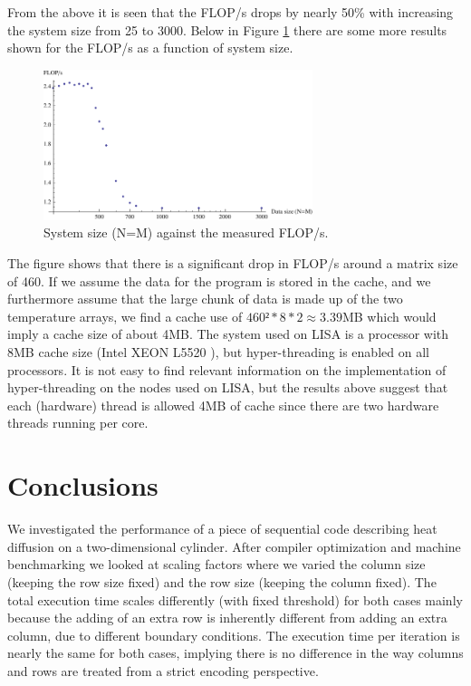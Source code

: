 \documentclass[11pt,a4paper,onecolumn]{article}
\begin{document}
From the above it is seen that the FLOP/s drops by nearly 50\% with increasing the system size from 25 to 3000. Below in Figure \ref{fig:cache} there are some more results shown for the FLOP/s as a function of system size.

\begin{figure}[H]
  \centering
  \includegraphics[width=0.7\textwidth]{cache.pdf}
  \caption{System size (N=M) against the measured FLOP/s.}
  \label{fig:cache}
\end{figure}

The figure shows that there is a significant drop in FLOP/s around a matrix size of 460. If we assume the data for the program is stored in the cache, and we furthermore assume that the large chunk of data is made up of the two temperature arrays, we find a cache use of $460² * 8 * 2 \approx 3.39$MB which would imply a cache size of about 4MB. The system used on LISA is a processor with 8MB cache size (Intel XEON L5520 \cite{LISA}), but hyper-threading is enabled on all processors. It is not easy to find relevant information on the implementation of hyper-threading on the nodes used on LISA, but the results above suggest that each (hardware) thread is allowed 4MB of cache since there are two hardware threads running per core.

\section{Conclusions}

We investigated the performance of a piece of sequential code describing heat diffusion on a two-dimensional cylinder. After compiler optimization and machine benchmarking we looked at scaling factors where we varied the column size (keeping the row size fixed) and the row size (keeping the column fixed). The total execution time scales differently (with fixed threshold) for both cases mainly because the adding of an extra row is inherently different from adding an extra column, due to different boundary conditions. The execution time per iteration is nearly the same for both cases, implying there is no difference in the way columns and rows are treated from a strict encoding perspective.
\end{document}
